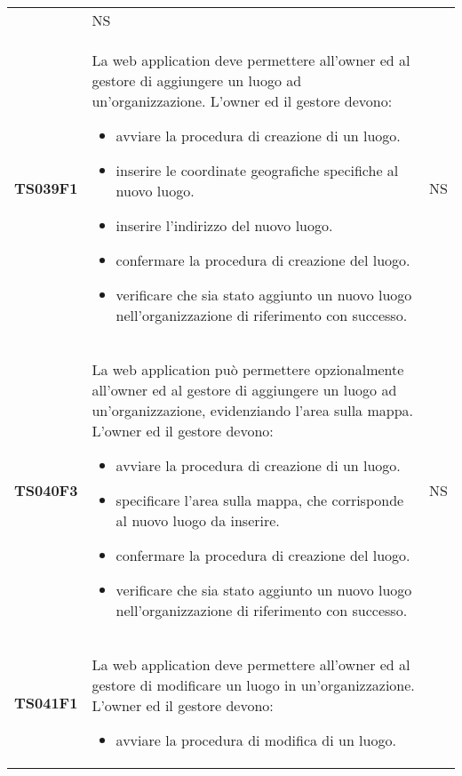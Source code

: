 \documentclass[../piano-di-qualifica.tex]{subfiles}
\begin{document}
\begin{centering}
\begin{longtable}[H]{>{\centering\bfseries}m{3cm} >{}p{10cm} >{\centering\arraybackslash}m{3cm}}
\begin{itemize}
                      \end{itemize}
                    & NS \\
        TS039F1     & La web application deve permettere all'owner ed al gestore di aggiungere un luogo ad un'organizzazione. \newline
                      L'owner ed il gestore devono:
                      \begin{itemize}
                        \item avviare la procedura di creazione di un luogo.
                        \item inserire le coordinate geografiche specifiche al nuovo luogo.
                        \item inserire l'indirizzo del nuovo luogo.
                        \item confermare la procedura di creazione del luogo.
                        \item verificare che sia stato aggiunto un nuovo luogo nell'organizzazione di riferimento con successo.
                      \end{itemize}
                    & NS \\
        TS040F3     & La web application può permettere opzionalmente all'owner ed al gestore di aggiungere un luogo ad un'organizzazione, evidenziando l'area sulla mappa. \newline
                      L'owner ed il gestore devono:
                      \begin{itemize}
                        \item avviare la procedura di creazione di un luogo.
                        \item specificare l'area sulla mappa, che corrisponde al nuovo luogo da inserire.
                        \item confermare la procedura di creazione del luogo.
                        \item verificare che sia stato aggiunto un nuovo luogo nell'organizzazione di riferimento con successo.
                      \end{itemize}
                    & NS \\
        TS041F1     & La web application deve permettere all'owner ed al gestore di modificare un luogo in un'organizzazione. \newline
                    L'owner ed il gestore devono:
                      \begin{itemize}
                        \item avviare la procedura di modifica di un luogo.

\end{itemize}
\end{longtable}
\end{centering}
\end{document}
